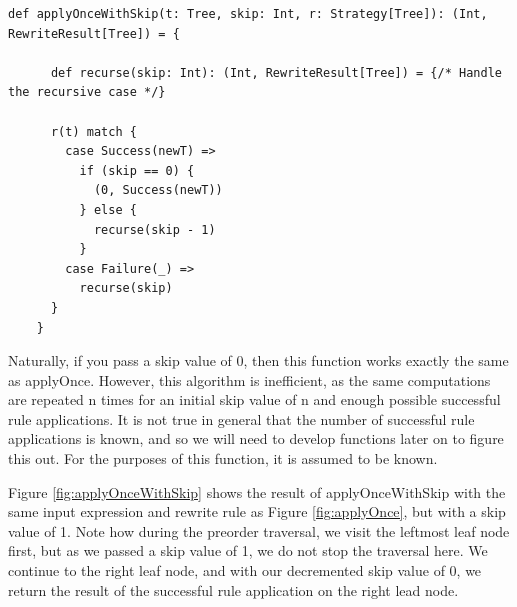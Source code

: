 \documentclass{l4proj}
\begin{document}
\begin{lstlisting}[caption={The same as Listing \ref{lst:applyOnce}, but with an additional skip parameter n which will 'skip' n successful rule applications before returning the result of a successful one}, label={lst:applyOnceWithSkip}]
    def applyOnceWithSkip(t: Tree, skip: Int, r: Strategy[Tree]): (Int, RewriteResult[Tree]) = {

      def recurse(skip: Int): (Int, RewriteResult[Tree]) = {/* Handle the recursive case */}

      r(t) match {
        case Success(newT) =>
          if (skip == 0) {
            (0, Success(newT))
          } else {
            recurse(skip - 1)
          }
        case Failure(_) =>
          recurse(skip)
      }
    }
\end{lstlisting}

Naturally, if you pass a skip value of 0, then this function works exactly the same as applyOnce.
However, this algorithm is inefficient, as the same computations are repeated n times for an initial skip value of n and enough possible successful rule applications. It is not true in general that the number of successful rule applications is known, and so we will need to develop functions later on to figure this out. For the purposes of this function, it is assumed to be known. 


Figure \ref{fig:applyOnceWithSkip} shows the result of applyOnceWithSkip with the same input expression and rewrite rule as Figure \ref{fig:applyOnce}, but with a skip value of 1. Note how during the preorder traversal, we visit the leftmost leaf node first, but as we passed a skip value of 1, we do not stop the traversal here. We continue to the right leaf node, and with our decremented skip value of 0, we return the result of the successful rule application on the right lead node.
\end{document}
